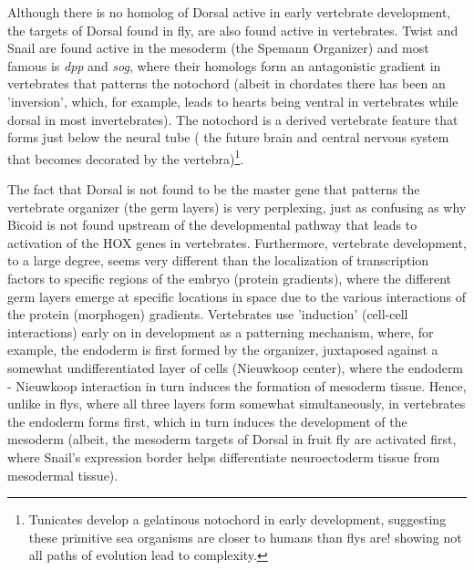 Although there is no homolog of Dorsal active in early vertebrate development, the targets of Dorsal found in fly, are also found active in vertebrates.  Twist and Snail are found active in the mesoderm (the Spemann Organizer) and most famous is \textit{dpp} and \textit{sog}, where their homologs form an antagonistic gradient in vertebrates that patterns the notochord (albeit in chordates there has been an 'inversion', which, for example, leads to hearts being ventral in vertebrates while dorsal in most invertebrates).  The notochord is a derived vertebrate feature that forms just below the neural tube ( the future brain and central nervous system that becomes decorated by the vertebra)\footnote{Tunicates develop a gelatinous notochord in early development, suggesting these primitive sea organisms are closer to humans than flys are! showing not all paths of evolution lead to complexity.}. 

The fact that Dorsal is not found to be the master gene that patterns the vertebrate organizer (the germ layers) is very perplexing, just as confusing as why Bicoid is not found upstream of the developmental pathway that leads to activation of the HOX genes in vertebrates.  Furthermore, vertebrate development, to a large degree, seems very different than the localization of transcription factors to specific regions of the embryo (protein gradients), where the different germ layers emerge at specific locations in space due to the various interactions of the protein (morphogen) gradients. Vertebrates use 'induction' (cell-cell interactions) early on in development as a patterning mechanism, where, for example, the endoderm is first formed by the organizer, juxtaposed against a somewhat undifferentiated layer of cells (Nieuwkoop center), where the endoderm - Nieuwkoop interaction in turn induces the formation of mesoderm tissue.  Hence, unlike in flys, where all three layers form somewhat simultaneously, in vertebrates the endoderm forms first, which in turn induces the development of the mesoderm (albeit, the mesoderm targets of Dorsal in fruit fly are activated first, where Snail's expression border helps differentiate neuroectoderm tissue from mesodermal tissue). 

